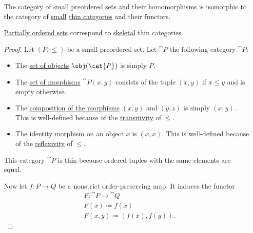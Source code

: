 \begin{theorem}\label{thm:order_category_isomorphism}
  The category of \hyperref[def:small_set]{small} \hyperref[def:preordered_set]{preordered sets} and their homomorphisms is \hyperref[def:isomorphism_of_categories]{isomorphic} to the category of \hyperref[def:small_category]{small} \hyperref[def:thin_category]{thin categories} and their functors.

  \hyperref[def:partially_ordered_set]{Partially ordered sets} correspond to \hyperref[def:skeletal_category]{skeletal} thin categories.
\end{theorem}
\begin{proof}
   Let \( (P, \leq) \) be a small preordered set. Let \( \cat{P} \) the following category \( \cat{P} \):
  \begin{itemize}
    \item The \hyperref[def:category/objects]{set of objects} \( \obj(\cat{P}) \) is simply \( P \).

    \item The \hyperref[def:category/morphisms]{set of morphisms} \( \cat{P}(x, y) \) consists of the tuple \( (x, y) \) if \( x \leq y \) and is empty otherwise.

    \item The \hyperref[def:category/composition]{composition of the morphisms} \( (x, y) \) and \( (y, z) \) is simply \( (x, y) \). This is well-defined because of the \hyperref[def:binary_relation/transitive]{transitivity} of \( \leq \).

    \item The \hyperref[def:category/identity]{identity morphism} on an object \( x \) is \( (x, x) \). This is well-defined because of the \hyperref[def:binary_relation/reflexive]{reflexivity} of \( \leq \).
  \end{itemize}

  This category \( \cat{P} \) is thin because ordered tuples with the same elements are equal.

  Now let \( f: P \to Q \) be a nonstrict order-preserving map. It induces the functor
  \begin{equation*}
    \begin{aligned}
      &F: \cat{P} \to \cat{Q} \\
      &F(x) \coloneqq f(x) \\
      &F(x, y) \coloneqq (f(x), f(y)).
    \end{aligned}
  \end{equation*}


\end{proof}
